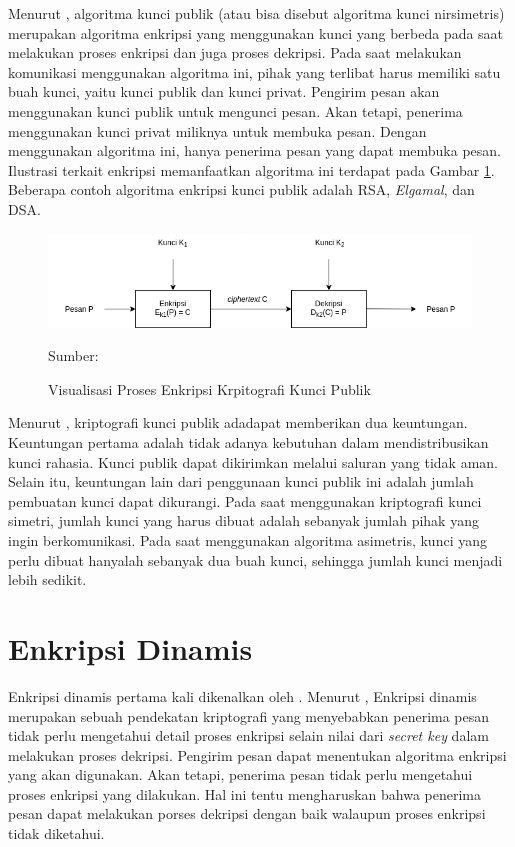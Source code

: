 Menurut \textcite{munir2019}, algoritma kunci publik (atau bisa disebut algoritma kunci nirsimetris) merupakan algoritma enkripsi yang menggunakan kunci yang berbeda pada saat melakukan proses enkripsi dan juga proses dekripsi. Pada saat melakukan komunikasi menggunakan algoritma ini, pihak yang terlibat harus memiliki satu buah kunci, yaitu kunci publik dan kunci privat. Pengirim pesan akan menggunakan kunci publik untuk mengunci pesan. Akan tetapi, penerima menggunakan kunci privat miliknya untuk membuka pesan. Dengan menggunakan algoritma ini, hanya penerima pesan yang dapat membuka pesan. Ilustrasi terkait enkripsi memanfaatkan algoritma ini terdapat pada Gambar \ref{fig:crypto.asymetric}. Beberapa contoh algoritma enkripsi kunci publik adalah RSA, \emph{Elgamal}, dan DSA.

\begin{figure}[!h]
  \centering
  \includegraphics[width=\textwidth]{chapters/res/chapter-2/img/crypto.asymetric.png}
  \caption{Visualisasi Proses Enkripsi Krpitografi Kunci Publik} 
  \label{fig:crypto.asymetric}
  Sumber: \textcite{munir2019}
\end{figure}

Menurut \textcite{munir2019}, kriptografi kunci publik adadapat memberikan dua keuntungan. Keuntungan pertama adalah tidak adanya kebutuhan dalam mendistribusikan kunci rahasia. Kunci publik dapat dikirimkan melalui saluran yang tidak aman. Selain itu, keuntungan lain dari penggunaan kunci publik ini adalah jumlah pembuatan kunci dapat dikurangi. Pada saat menggunakan kriptografi kunci simetri, jumlah kunci yang harus dibuat adalah sebanyak jumlah pihak yang ingin berkomunikasi. Pada saat menggunakan algoritma asimetris, kunci yang perlu dibuat hanyalah sebanyak dua buah kunci, sehingga jumlah kunci menjadi lebih sedikit.

\section{Enkripsi Dinamis}
Enkripsi dinamis pertama kali dikenalkan oleh \textcite{knudsen2015}. Menurut \textcite{knudsen2015}, Enkripsi dinamis merupakan sebuah pendekatan kriptografi yang menyebabkan penerima pesan tidak perlu mengetahui detail proses enkripsi selain nilai dari \emph{secret key} dalam melakukan proses dekripsi. Pengirim pesan dapat menentukan algoritma enkripsi yang akan digunakan. Akan tetapi, penerima pesan tidak perlu mengetahui proses enkripsi yang dilakukan. Hal ini tentu mengharuskan bahwa penerima pesan dapat melakukan porses dekripsi dengan baik walaupun proses enkripsi tidak diketahui. 

